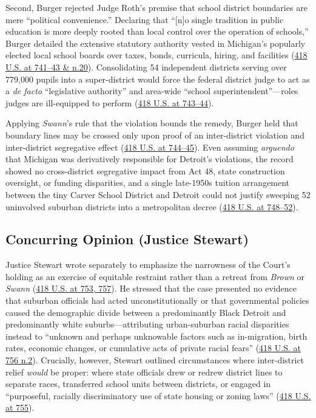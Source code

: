 \documentclass[12pt]{article}
\begin{document}
Second, Burger rejected Judge Roth's premise that school district boundaries are mere ``political convenience.'' Declaring that ``[n]o single tradition in public education is more deeply rooted than local control over the operation of schools,'' Burger detailed the extensive statutory authority vested in Michigan's popularly elected local school boards over taxes, bonds, curricula, hiring, and facilities (\href{https://supreme.justia.com/cases/federal/us/418/717/}{418 U.S. at 741--43 \& n.20}). Consolidating 54 independent districts serving over 779,000 pupils into a super-district would force the federal district judge to act as a \textit{de facto} ``legislative authority'' and area-wide ``school superintendent''---roles judges are ill-equipped to perform (\href{https://supreme.justia.com/cases/federal/us/418/717/}{418 U.S. at 743--44}).

Applying \textit{Swann}'s rule that the violation bounds the remedy, Burger held that boundary lines may be crossed only upon proof of an inter-district violation and inter-district segregative effect (\href{https://supreme.justia.com/cases/federal/us/418/717/}{418 U.S. at 744--45}). Even assuming \textit{arguendo} that Michigan was derivatively responsible for Detroit's violations, the record showed no cross-district segregative impact from Act 48, state construction oversight, or funding disparities, and a single late-1950s tuition arrangement between the tiny Carver School District and Detroit could not justify sweeping 52 uninvolved suburban districts into a metropolitan decree (\href{https://supreme.justia.com/cases/federal/us/418/717/}{418 U.S. at 748--52}).

\subsection{Concurring Opinion (Justice Stewart)}
Justice Stewart wrote separately to emphasize the narrowness of the Court's holding as an exercise of equitable restraint rather than a retreat from \textit{Brown} or \textit{Swann} (\href{https://supreme.justia.com/cases/federal/us/418/717/}{418 U.S. at 753, 757}). He stressed that the case presented no evidence that suburban officials had acted unconstitutionally or that governmental policies caused the demographic divide between a predominantly Black Detroit and predominantly white suburbs---attributing urban-suburban racial disparities instead to ``unknown and perhaps unknowable factors such as in-migration, birth rates, economic changes, or cumulative acts of private racial fears'' (\href{https://supreme.justia.com/cases/federal/us/418/717/}{418 U.S. at 756 n.2}). Crucially, however, Stewart outlined circumstances where inter-district relief \textit{would} be proper: where state officials drew or redrew district lines to separate races, transferred school units between districts, or engaged in ``purposeful, racially discriminatory use of state housing or zoning laws'' (\href{https://supreme.justia.com/cases/federal/us/418/717/}{418 U.S. at 755}).
\end{document}
